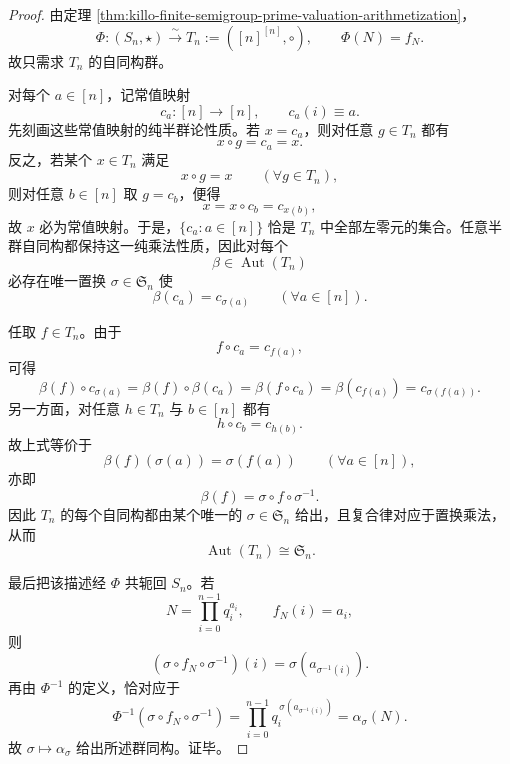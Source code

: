 \begin{proof}
由定理 \ref{thm:killo-finite-semigroup-prime-valuation-arithmetization}，
\[
\Phi:(S_n,\star)\xrightarrow{\sim}T_n:=([n]^{[n]},\circ),
\qquad
\Phi(N)=f_N.
\]
故只需求 \(T_n\) 的自同构群。

对每个 \(a\in[n]\)，记常值映射
\[
c_a:[n]\to[n],
\qquad
c_a(i)\equiv a.
\]
先刻画这些常值映射的纯半群论性质。若 \(x=c_a\)，则对任意 \(g\in T_n\) 都有
\[
x\circ g=c_a=x.
\]
反之，若某个 \(x\in T_n\) 满足
\[
x\circ g=x
\qquad
(\forall g\in T_n),
\]
则对任意 \(b\in[n]\) 取 \(g=c_b\)，便得
\[
x=x\circ c_b=c_{x(b)},
\]
故 \(x\) 必为常值映射。于是，\(\{c_a:a\in[n]\}\) 恰是 \(T_n\) 中全部左零元的集合。任意半群自同构都保持这一纯乘法性质，因此对每个
\[
\beta\in \operatorname{Aut}(T_n)
\]
必存在唯一置换 \(\sigma\in\mathfrak S_n\) 使
\[
\beta(c_a)=c_{\sigma(a)}
\qquad
(\forall a\in[n]).
\]

任取 \(f\in T_n\)。由于
\[
f\circ c_a=c_{f(a)},
\]
可得
\[
\beta(f)\circ c_{\sigma(a)}
=
\beta(f)\circ \beta(c_a)
=
\beta(f\circ c_a)
=
\beta(c_{f(a)})
=
c_{\sigma(f(a))}.
\]
另一方面，对任意 \(h\in T_n\) 与 \(b\in[n]\) 都有
\[
h\circ c_b=c_{h(b)}.
\]
故上式等价于
\[
\beta(f)(\sigma(a))=\sigma(f(a))
\qquad
(\forall a\in[n]),
\]
亦即
\[
\beta(f)=\sigma\circ f\circ \sigma^{-1}.
\]
因此 \(T_n\) 的每个自同构都由某个唯一的 \(\sigma\in\mathfrak S_n\) 给出，且复合律对应于置换乘法，从而
\[
\operatorname{Aut}(T_n)\cong \mathfrak S_n.
\]

最后把该描述经 \(\Phi\) 共轭回 \(S_n\)。若
\[
N=\prod_{i=0}^{n-1}q_i^{a_i},
\qquad
f_N(i)=a_i,
\]
则
\[
(\sigma\circ f_N\circ \sigma^{-1})(i)
=
\sigma(a_{\sigma^{-1}(i)}).
\]
再由 \(\Phi^{-1}\) 的定义，恰对应于
\[
\Phi^{-1}(\sigma\circ f_N\circ \sigma^{-1})
=
\prod_{i=0}^{n-1}q_i^{\,\sigma(a_{\sigma^{-1}(i)})}
=
\alpha_\sigma(N).
\]
故 \(\sigma\mapsto \alpha_\sigma\) 给出所述群同构。证毕。
\end{proof}


